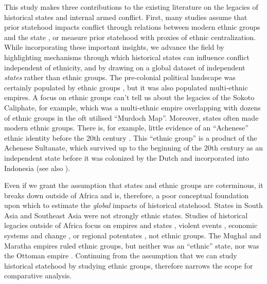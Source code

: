 This study makes three contributions to the existing literature on the legacies
of historical states and internal armed conflict. First, many studies assume
that prior statehood impacts conflict through relations between modern ethnic
groups and the state \citep{Englebert2002, Paine2019, Wig2016}, or measure prior
statehood with proxies of ethnic centralization. While incorporating these
important insights, we advance the field by highlighting mechanisms through
which historical states can influence conflict independent of ethnicity, and by
drawing on a global dataset of independent \textit{states} rather than ethnic
groups. The pre-colonial political landscape was certainly populated by ethnic
groups \citep{Murdock1967}, but it was also populated multi-ethnic empires. A
focus on ethnic groups can’t tell us about the legacies of the Sokoto Caliphate,
for example, which was a multi-ethnic empire overlapping with dozens of ethnic
groups in the oft utilised ``Murdoch Map''. Moreover, states often made modern
ethnic groups. There is, for example, little evidence of an ``Achenese'' ethnic
identity before the 20th century \citep{Aspinall2009}. This ``ethnic group'' is
a product of the Achenese Sultanate, which survived up to the beginning of the
20th century as an independent state before it was colonized by the Dutch and
incorporated into Indonesia (see also \citep{Wimmer2018}). 

Even if we grant the assumption that states and ethnic groups are coterminous,
it breaks down outside of Africa and is, therefore, a poor conceptual foundation
upon which to estimate the \textit{global} impacts of historical statehood.
States in South Asia and Southeast Asia were not strongly ethnic states. Studies
of historical legacies outside of Africa focus on empires and states
\citep{Acemoglu2011, Grosjean2011}, violent events \citep{Grosfeld2013},
economic systems and change \citep{Banerjee2005, Nunn2011}, or regional
potentates \citep{Mazzuca2021}, not ethnic groups. The Mughal and Maratha
empires ruled ethnic groups, but neither was an ``ethnic'' state, nor was the
Ottoman empire \citep{Richards1995, Ramusack2004, Gordon1993}. Continuing from
the assumption that we can study historical statehood by studying ethnic groups,
therefore narrows the scope for comparative analysis.

